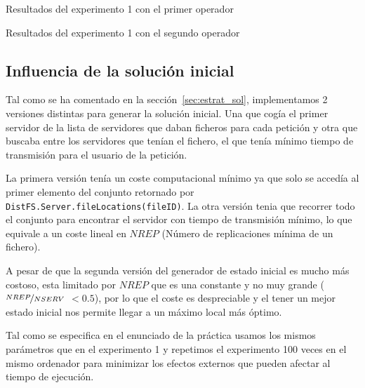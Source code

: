 \begin{table}[H]
    \caption{Resultados del experimento 1 con el primer operador}%
    \label{tab:ex1a}
\vspace{-1em}
    \begin{center}
    
    \end{center}
\vspace{-0.5em}
    \caption{Resultados del experimento 1 con el segundo operador}%
    \label{tab:ex1b}
\vspace{-1.5em}
    \begin{center}
    
    \end{center}
\end{table}


\subsection{Influencia de la solución inicial}

Tal como se ha comentado en la sección~\ref{sec:estrat_sol}, implementamos 2 versiones distintas
para generar la solución inicial. Una que cogía el primer servidor de la lista de servidores que daban ficheros
para cada petición y otra que buscaba entre los servidores que tenían el fichero, el que tenía mínimo
tiempo de transmisión para el usuario de la petición.

La primera versión tenía un coste computacional mínimo ya que solo se accedía al primer elemento del
conjunto retornado por \texttt{DistFS.Server.fileLocations(fileID)}. La otra versión tenia que recorrer
todo el conjunto para encontrar el servidor con tiempo de transmisión mínimo, lo que equivale a un coste
lineal en $NREP$ (Número de replicaciones mínima de un fichero).

\begin{hyp*}
A pesar de que la segunda versión del generador de estado inicial es mucho más costoso, esta limitado
por $NREP$ que es una constante y no muy grande ($\nicefrac{NREP}{NSERV}$ $<0.5$), por lo que el coste es despreciable
y el tener un mejor estado inicial nos permite llegar a un máximo local más óptimo.
\end{hyp*}

Tal como se especifica en el enunciado de la práctica usamos los mismos parámetros que en el experimento
1 y repetimos el experimento 100 veces en el mismo ordenador para minimizar los efectos externos que
pueden afectar al tiempo de ejecución.

